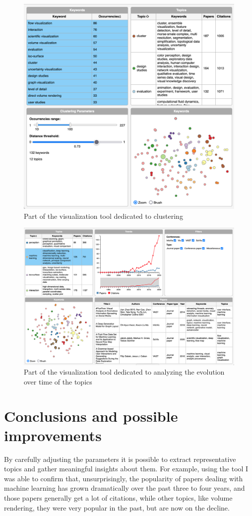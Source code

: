 \documentclass[11pt]{article}
\begin{document}
 \begin{figure}[h!]
  \centering
  \includegraphics[width=0.6\linewidth]{clustering}
  \caption{Part of the visualization tool dedicated to clustering}
  \label{fig:clustering}
\end{figure}

 \begin{figure}[h!]
  \centering
  \includegraphics[width=0.9\linewidth]{trends}
  \caption{Part of the visualization tool dedicated to analyzing the evolution over time of the topics}
  \label{fig:trends}
\end{figure}

\newpage

\section{Conclusions and possible improvements} \label{sec:conclusions}
By carefully adjusting the parameters it is possible to extract representative topics and gather meaningful insights about them. For example, using the tool I was able to confirm that, unsurprisingly, the popularity of papers dealing with machine learning has grown dramatically over the past three to four years, and those papers generally get a lot of citations, while other topics, like volume rendering, they were very popular in the past, but are now on the decline.
\end{document}

